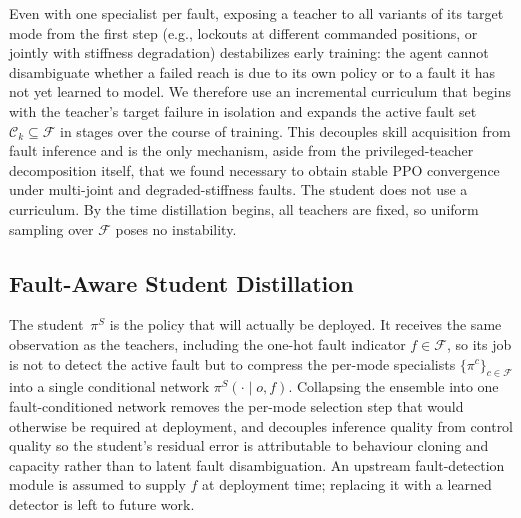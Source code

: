 \documentclass{article}
\begin{document}
		Even with one specialist per fault, exposing a teacher to all variants of its
		target mode from the first step (e.g., lockouts at different commanded
		positions, or jointly with stiffness degradation) destabilizes early training:
		the agent cannot disambiguate whether a failed reach is due to its own policy
		or to a fault it has not yet learned to model. We therefore use an incremental
		curriculum that begins with the teacher's target failure in isolation and
		expands the active fault set $\mathcal{C}_k\subseteq\mathcal{F}$ in stages over
		the course of training. This decouples skill acquisition from fault inference
		and is the only mechanism, aside from the privileged-teacher decomposition
		itself, that we found necessary to obtain stable PPO convergence under
		multi-joint and degraded-stiffness faults. The student does not use a
		curriculum.  By the time distillation begins, all teachers are fixed, so
		uniform sampling over $\mathcal{F}$ poses no instability.

	\subsection{Fault-Aware Student Distillation}
	\label{subsec:distillation}

		The student~$\pi^S$ is the policy that will actually be deployed. It receives the same
		observation as the teachers, including the one-hot fault indicator
		$f\in\mathcal{F}$, so its job is not to detect the active fault but to compress the
		per-mode specialists $\{\pi^c\}_{c\in\mathcal{F}}$ into a single conditional network
		$\pi^S(\cdot\mid o, f)$. Collapsing the ensemble into one fault-conditioned network removes
		the per-mode selection step that would otherwise be required at deployment, and decouples
		inference quality from control quality so the student's residual error is attributable to
		behaviour cloning and capacity rather than to latent fault disambiguation. An upstream
		fault-detection module is assumed to supply $f$ at deployment time; replacing it with a
		learned detector is left to future work.
\end{document}
